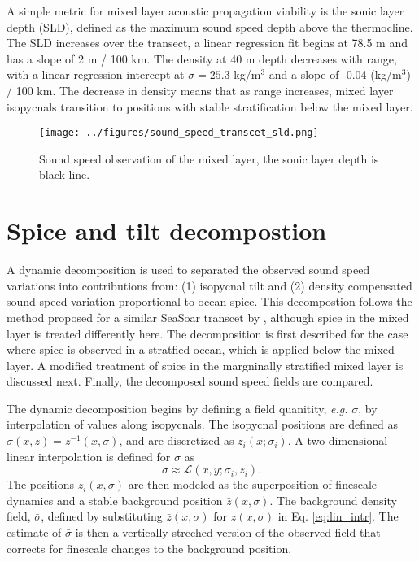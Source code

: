 \documentclass[preprint]{JASA}
\begin{document}
A simple metric for mixed layer acoustic propagation viability is the sonic layer depth (SLD), defined as the maximum sound speed depth above the thermocline. The SLD increases over the transect, a linear regression fit begins at 78.5 m and has a slope of 2 m / 100 km. The density at 40 m depth decreases with range, with a linear regression intercept at $\sigma=25.3$ kg/m$^3$ and a slope of -0.04 (kg/m$^3$) / 100 km. The decrease in density means that as range increases, mixed layer isopycnals transition to positions with stable stratification below the mixed layer.

\begin{figure}
\texttt{[image: ../figures/sound\_speed\_transcet\_sld.png]}
\caption{\label{fig:transcet}{Sound speed observation of the mixed layer, the sonic layer depth is black line.}}
\end{figure}

\section{\label{sec:decomposition}Spice and tilt decompostion}
A dynamic decomposition is used to separated the observed sound speed variations into contributions from: (1) isopycnal tilt and (2) density compensated sound speed variation proportional to ocean spice. This decompostion follows the method proposed for a similar SeaSoar transcet by \citet{dzieciuch2004}, although spice in the mixed layer is treated differently here. The decomposition is first described for the case where spice is observed in a stratfied ocean, which is applied below the mixed layer. A modified treatment of spice in the margninally stratified mixed layer is discussed next. Finally, the decomposed sound speed fields are compared.

The dynamic decomposition begins by defining a field quanitity, \emph{e.g.} $\sigma$, by interpolation of values along isopycnals. The isopycnal positions are defined as $\sigma(x, z) = z^{-1}(x, \sigma)$, and are discretized as $z_i(x; \sigma_i)$. A two dimensional linear interpolation is defined for $\sigma$ as
\begin{equation}
    \sigma\approx\mathcal{L}(x, y; \sigma_i, z_i).
    \label{eq:lin_intr}
\end{equation}
The positions $z_i(x, \sigma)$ are then modeled as the superposition of finescale dynamics and a stable background position $\bar{z}(x, \sigma)$. The background density field, $\bar{\sigma}$, defined by substituting $\bar{z}(x, \sigma)$ for $z(x, \sigma)$ in Eq. \eqref{eq:lin_intr}. The estimate of $\bar{\sigma}$ is then a vertically streched version of the observed field that corrects for finescale changes to the background position.
\end{document}

